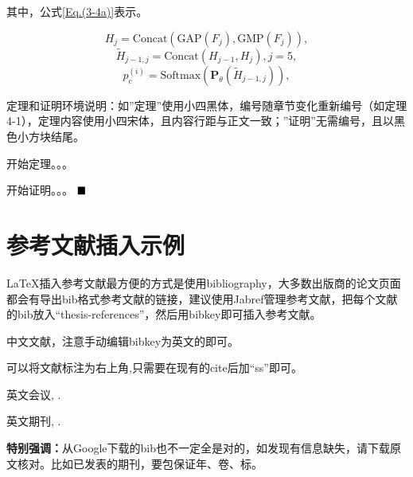 其中，公式\ref{Eq.(3-4a)}表示。

\begin{equation}    
	H_{j}= \mathrm{Concat}(\mathrm{GAP}({F}_{j}),\mathrm{GMP}({F}_{j})),
\end{equation}
\begin{equation}    
	\tilde{H}_{j-1,j}= \mathrm{Concat}(H_{j-1},H_{j}),j=5,
\end{equation}
\begin{equation}    
	p_c^{(i)}=\mathrm{Softmax}(\boldsymbol{P}_\theta(\tilde{H}_{j-1,j})),
\end{equation}

定理和证明环境说明：如”定理”使用小四黑体，编号随章节变化重新编号（如定理4-1），定理内容使用小四宋体，且内容行距与正文一致；”证明”无需编号，且以黑色小方块结尾。

\begin{theorem}\label{theorem1}
	\setlength{\baselineskip}{20pt}         %
	\renewcommand{\baselinestretch}{1.0}   %
	开始定理。。。
\end{theorem}

\begin{proof*} %
	\setlength{\baselineskip}{20pt}         %
	\renewcommand{\baselinestretch}{1.0}   %
	开始证明。。。
	$\hfill\blacksquare$ %
\end{proof*}

\clearpage

\section{参考文献插入示例}

LaTeX\cite{lamport1994latex}插入参考文献最方便的方式是使用bibliography\cite{pritchard1969statistical}，大多数出版商的论文页面都会有导出bib格式参考文献的链接，建议使用Jabref管理参考文献，把每个文献的bib放入``thesis-references''，然后用bibkey即可插入参考文献。

中文文献\cite{zh-book-1}，注意手动编辑bibkey为英文的即可。

可以将文献标注为右上角,只需要在现有的cite后加“ss”即可。

英文会议\cite{Kraus2021Current}, \cite{WuYangLuEtAl2021}.

英文期刊\cite{LuoZengYuanEtAl2016}, \cite{Wu2022Boosting}.


\textbf{特别强调：}从Google下载的bib也不一定全是对的，如发现有信息缺失，请下载原文核对。比如已发表的期刊，要包保证年、卷、标。

